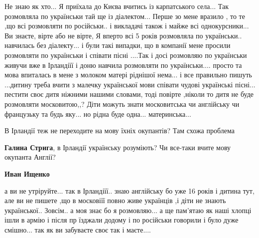 \begin{itemize}
Не знаю як хто... Я приїхала до Києва вчитись із карпатського села... Так
розмовляла по українськи тай ще із діалектом... Перше зо мене вразило , то те
,що всі розмовляти по російськи.. і викладачі також і майже всі
однокурсники... Ви знаєте, вірте або не вірте, Я вперто всі 5 років розмовляла по
українськи.. навчилась без діалекту... і були такі випадки, що в компанії мене
просили розмовляти по українськи і співати пісні ....Так і досі розмовляю по
українськи живучи вже в Ірландіїї і доню навчила розмовляти по
українськи.... просто та мова впиталась в мене з молоком матері ріднішої
нема... і все правильно пишуть ...дитину треба вчити з малечку української мови
співати чудові українські пісні... пестити своє дитя ніжними нашими словами, тоді
повірте ,ніколи то дитя не буде розмовляти московитою,,? Діти можуть знати
московитська чи англійську чи французьку та будь яку... но рідна буде
одна... материнська...

\begin{itemize}
 
В Ірландії теж не переходите на мову їхніх окупантів? Там схожа проблема

 
\textbf{Галина Стрига}, в Ірландії українську розуміють? Чи все-таки вчите мову окупанта Англії?

\begin{itemize}
 
\textbf{Иван Ищенко} 

а ви не утріруйте... так в Ірландіїї.. знаю англійську бо уже 16 років і дитина
тут, але ви не пишете ,що в московіїї повно живе українців ,і діти не знають
української.. Зовсім.. а моя знає бо я розмовляю... а ще пам'ятаю як наші
хлопці ішли в армію і після пр їзджали додому і по російськи говорили і було
дуже смішно... так як ви забуваєте своє так і маєте....



\end{itemize}
\end{itemize}
\end{itemize}
